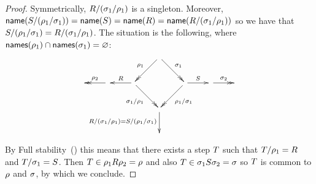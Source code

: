 \begin{proof}
Symmetrically, $R/(\sigma_1/\rho_1)$ is a singleton.
Moreover, $\mathsf{name}(S/(\rho_1/\sigma_1)) = \mathsf{name}(S) = \mathsf{name}(R) = \mathsf{name}(R/(\sigma_1/\rho_1))$ 
so we have that $S/(\rho_1/\sigma_1) = R/(\sigma_1/\rho_1)$.
The situation is the following, where $\mathsf{names}(\rho_1) \cap \mathsf{names}(\sigma_1) = \varnothing$:
\[
  \xymatrix{
    &
    &
    & \ar@{->>}[ld]_{\redseq_1} \ar@{->>}[rd]^{\redseqtwo_1} &
  \\
    &
    \ar@{->>}[l]_{\redseq_2}
    &
    \ar[l]_{\redex}
    \ar@{->>}[rd]_{\redseqtwo_1/\redseq_1} & & \ar@{->>}[ld]^{\redseq_1/\redseqtwo_1} \ar[r]^{\redextwo}
    &
    \ar@{->>}[r]^{\redseqtwo_2}
    &
  \\
    &
    &
    &
    \ar[d]_{\redex/(\redseqtwo_1/\redseq_1) = \redextwo/(\redseq_1/\redseqtwo_1)}
    &
  \\
    &
    &&&
  }
\]
By Full stability~() this means that there exists a step $T$
such that $T/\rho_1 = R$ and $T/\sigma_1 = S$.
Then $T \in \rho_1R\rho_2 = \rho$
and also $T \in \sigma_1S\sigma_2 = \sigma$
so $T$ is common to $\rho$ and $\sigma$,
by which we conclude.
\end{proof}


